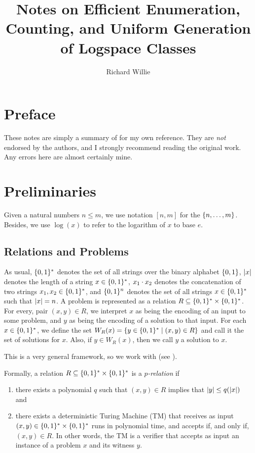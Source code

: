 \documentclass[11pt,twoside=off,numbers=noenddot]{scrbook}
\title{Notes on Efficient Enumeration, Counting, and Uniform Generation of Logspace Classes}
\author{Richard Willie}
\begin{document}
\maketitle

\chapter*{Preface}
These notes are simply a summary of \cite{arenas2021nfa} for my own reference. They are \textit{not} endorsed by the authors, and I strongly recommend reading the original work. Any errors here are almost certainly mine.

\tableofcontents

\newpage

\chapter{Preliminaries}
Given a natural numbers $n \leq m$, we use notation $[n, m]$ for the $\{ n, \dots, m \}$. Besides, we use $\log(x)$ to refer to the logarithm of $x$ to base $e$.

\section{Relations and Problems}
As usual, $\{ 0, 1 \}^\ast$ denotes the set of all strings over the binary alphabet $\{ 0, 1 \}$, $| x |$ denotes the length of a string $x \in \{ 0, 1 \}^\ast$, $x_1 \cdot x_2$ denotes the concatenation of two strings $x_1, x_2 \in \{ 0, 1 \}^\ast$, and $\{ 0, 1 \}^n$ denotes the set of all strings $x \in \{ 0, 1 \}^\ast$ such that $| x | = n$. A problem is represented as a relation $R \subseteq \{ 0, 1 \}^\ast \times \{ 0, 1 \}^\ast$. For every, pair $(x, y) \in R$, we interpret $x$ as being the encoding of an input to some problem, and $y$ as being the encoding of a solution to that input. For each $x \in \{ 0, 1 \}^\ast$, we define the set $W_R(x) = \{ y \in \{ 0, 1 \}^\ast \mid (x, y) \in R \}$ and call it the set of solutions for $x$. Also, if $y \in W_R(x)$, then we call $y$ a solution to $x$.

This is a very general framework, so we work with  (see \cite{jerrum1986random}).

\begin{definition}[$p$-relation]
    Formally, a relation $R \subseteq \{ 0, 1 \}^\ast \times \{ 0, 1 \}^\ast$ is a \emph{$p$-relation} if
    \begin{enumerate}
        \item there exists a polynomial $q$ such that $(x, y) \in R$ implies that $| y | \leq q(| x |)$ and
        \item there exists a deterministic Turing Machine (TM) that receives as input $(x, y) \in \{ 0, 1 \}^\ast \times \{ 0, 1 \}^\ast$ runs in polynomial time, and accepts if, and only if, $(x, y) \in R$. In other words, the TM is a verifier that accepts as input an instance of a problem $x$ and its witness $y$.
    \end{enumerate}
\end{definition}
\end{document}
